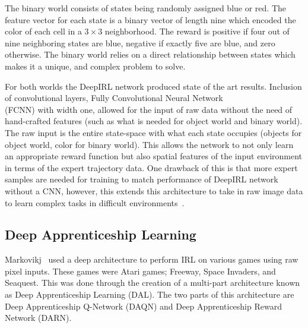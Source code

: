 \documentclass[12pt,american]{report}
\providecommand{\DIFaddbegin}{} %
\providecommand{\DIFaddend}{} %
\newcommand{\DIFaddincludegraphics}[2][]{{\color{blue}\fbox{\DIFOincludegraphics[#1]{#2}}}} %
\DeclareRobustCommand{\DIFaddbegin}{\DIFOaddbegin \let\includegraphics\DIFaddincludegraphics} %
\DeclareRobustCommand{\DIFaddend}{\DIFOaddend \let\includegraphics\DIFOincludegraphics} %
\begin{document}
The binary world consists of states being randomly assigned blue or red.  The feature vector for each state is a binary vector of length nine which encoded the color of each cell in a $3\times 3$ neighborhood. The reward is positive if four out of nine neighboring states are blue, negative if exactly five are blue, and zero otherwise.  The binary world relies on a direct relationship between states which makes it a unique, and complex problem to solve. 

For both worlds the DeepIRL network produced state of the art results. Inclusion of convolutional layers, Fully Convolutional Neural Network \DIFaddbegin \\\DIFaddend (FCNN) with width one, allowed for the input of raw data without the need of hand-crafted features (such as what is needed for object world and binary world). The raw input is the entire state-space with what each state occupies (objects for object world, color for binary world). This allows the network to not only learn an appropriate reward function but also spatial features of the input environment in terms of the expert trajectory data.  One drawback of this is that more expert samples are needed for training to match performance of DeepIRL network without a CNN, however, this extends this architecture to take in raw image data to learn complex tasks in difficult environments~\cite{wulfmeier2015maximum}.

\subsection{Deep Apprenticeship Learning}
\label{sec:DAL}
Markovikj~\cite{markovikj2014deep} used a deep architecture to perform IRL on various games using raw pixel inputs. These games were Atari games; Freeway, Space Invaders, and Seaquest. This was done through the creation of a multi-part architecture known as Deep Apprenticeship Learning (DAL). The two parts of this architecture are Deep Apprenticeship Q-Network (DAQN) and Deep Apprenticeship Reward Network (DARN).
\end{document}
